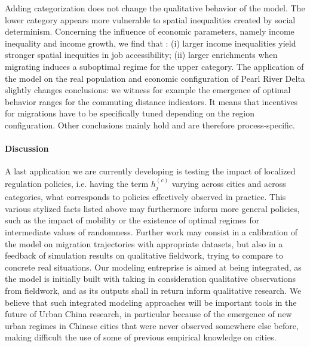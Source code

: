  Adding categorization does not change the qualitative behavior of the model. %
 The lower category appears more vulnerable to spatial inequalities created by social determinism. Concerning the influence of economic parameters, namely income inequality and income growth, we find that : (i) larger income inequalities yield stronger spatial inequities in job accessibility; (ii) larger enrichments when migrating induces a suboptimal regime for the upper category. The application of the model on the real population and economic configuration of Pearl River Delta slightly changes conclusions: we witness for example the emergence of optimal behavior ranges for the commuting distance indicators. It means that incentives for migrations have to be specifically tuned depending on the region configuration. Other conclusions mainly hold and are therefore process-specific.



\paragraph{Discussion}

A last application we are currently developing is testing the impact of localized regulation policies, i.e. having the term $h_j^{(c)}$ varying across cities and across categories, what corresponds to policies effectively observed in practice. This various stylized facts listed above may furthermore inform more general policies, such as the impact of mobility or the existence of optimal regimes for intermediate values of randomness. Further work may consist in a calibration of the model on migration trajectories with appropriate datasets, but also in a feedback of simulation results on qualitative fieldwork, trying to compare to concrete real situations. Our modeling entreprise is aimed at being integrated, as the model is initially built with taking in consideration qualitative observations from fieldwork, and as its outputs shall in return inform qualitative research. We believe that such integrated modeling approaches will be important tools in the future of Urban China research, in particular because of the emergence of new urban regimes in Chinese cities that were never observed somewhere else before, making difficult the use of some of previous empirical knowledge on cities.






